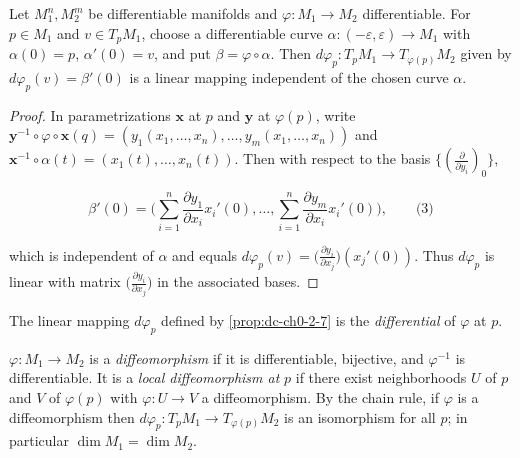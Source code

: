 \begin{proposition}
  \label{prop:dc-ch0-2-7}
  \leanok
  Let $M_1^n,M_2^m$ be differentiable manifolds and $\varphi:M_1\to M_2$
  differentiable. For $p\in M_1$ and $v\in T_pM_1$, choose a differentiable curve
  $\alpha:(-\varepsilon,\varepsilon)\to M_1$ with $\alpha(0)=p$, $\alpha'(0)=v$, and
  put $\beta=\varphi\circ\alpha$. Then
  $d\varphi_p:T_pM_1\to T_{\varphi(p)}M_2$ given by $d\varphi_p(v)=\beta'(0)$ is a
  linear mapping independent of the chosen curve $\alpha$.
\end{proposition}
\begin{proof}
  \sketch
  \leanok
  In parametrizations $\mathbf{x}$ at $p$ and $\mathbf{y}$ at $\varphi(p)$,
  write $\mathbf{y}^{-1}\circ\varphi\circ\mathbf{x}(q)=(y_1(x_1,\dots,x_n),\dots,y_m(x_1,\dots,x_n))$
  and $\mathbf{x}^{-1}\circ\alpha(t)=(x_1(t),\dots,x_n(t))$. Then with respect to
  the basis $\{(\frac{\partial}{\partial y_i})_0\}$,
  
  $$
  \beta'(0)=\Big(\sum_{i=1}^n\frac{\partial y_1}{\partial x_i}x_i'(0),\dots,\sum_{i=1}^n\frac{\partial y_m}{\partial x_i}x_i'(0)\Big),\qquad\text{(3)}
  $$
  
  which is independent of $\alpha$ and equals
  $d\varphi_p(v)=\big(\frac{\partial y_i}{\partial x_j}\big)(x_j'(0))$. Thus
  $d\varphi_p$ is linear with matrix $\big(\frac{\partial y_i}{\partial x_j}\big)$
  in the associated bases.
\end{proof}

\begin{definition}[differential]
  \label{def:dc-ch0-2-8}
  \leanok
  The linear mapping $d\varphi_p$ defined by \cref{prop:dc-ch0-2-7} is the \emph{differential}
  of $\varphi$ at $p$.
\end{definition}

\begin{definition}
  \label{def:dc-ch0-2-9}
  \leanok
  $\varphi:M_1\to M_2$ is a \emph{diffeomorphism} if it is differentiable, bijective, and
  $\varphi^{-1}$ is differentiable. It is a \emph{local diffeomorphism at} $p$ if there
  exist neighborhoods $U$ of $p$ and $V$ of $\varphi(p)$ with $\varphi:U\to V$ a
  diffeomorphism. By the chain rule, if $\varphi$ is a diffeomorphism then
  $d\varphi_p:T_pM_1\to T_{\varphi(p)}M_2$ is an isomorphism for all $p$; in
  particular $\dim M_1=\dim M_2$.
\end{definition}


